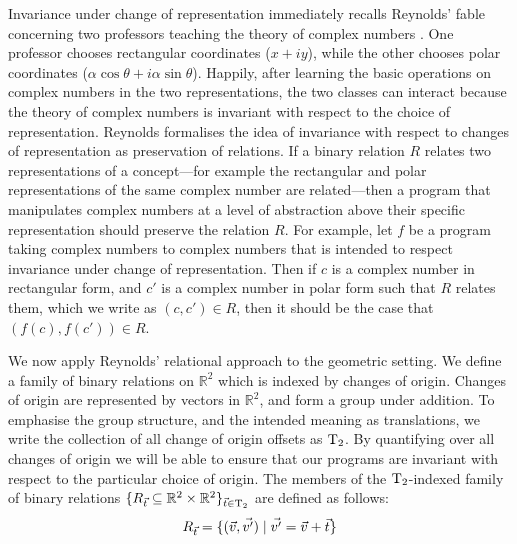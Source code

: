 Invariance under change of representation immediately recalls
Reynolds' fable concerning two professors teaching the theory of
complex numbers \cite{reynolds83types}. One professor chooses
rectangular coordinates ($x + iy$), while the other chooses polar
coordinates ($\alpha\cos\theta + i\alpha\sin\theta$). Happily, after
learning the basic operations on complex numbers in the two
representations, the two classes can interact because the theory of
complex numbers is invariant with respect to the choice of
representation. Reynolds formalises the idea of invariance with
respect to changes of representation as preservation of relations. If
a binary relation $R$ relates two representations of a concept---for
example the rectangular and polar representations of the same complex
number are related---then a program that manipulates complex numbers
at a level of abstraction above their specific representation should
preserve the relation $R$. For example, let $f$ be a program taking
complex numbers to complex numbers that is intended to respect
invariance under change of representation. Then if $c$ is a complex
number in rectangular form, and $c'$ is a complex number in polar form
such that $R$ relates them, which we write as $(c,c') \in R$, then it
should be the case that $(f(c), f(c')) \in R$.

We now apply Reynolds' relational approach to the geometric
setting. We define a family of binary relations on $\mathbb{R}^2$
which is indexed by changes of origin. Changes of origin are
represented by vectors in $\mathbb{R}^2$, and form a group under
addition. To emphasise the group structure, and the intended meaning
as translations, we write the collection of all change of origin
offsets as $\mathrm{T}_2$. By quantifying over all changes of origin we
will be able to ensure that our programs are invariant with respect to
the particular choice of origin. The members of the
$\mathrm{T}_2$-indexed family of binary relations $\{ R_{\vec{t}}
\subseteq \mathbb{R}^2 \times \mathbb{R}^2 \}_{\vec{t} \in \mathrm{T}_2}$
are defined as follows:
\begin{displaymath}
  R_{\vec{t}} = \{ (\vec{v}, \vec{v'}) \mathrel| \vec{v'} = \vec{v} + \vec{t} \}
\end{displaymath}

